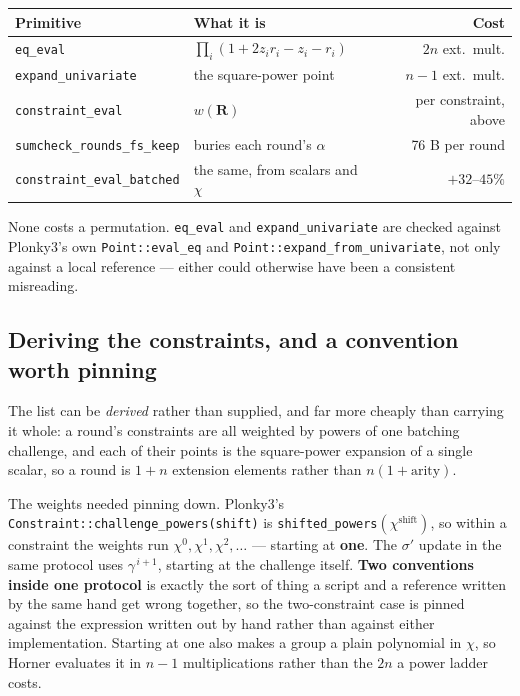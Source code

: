 \documentclass[11pt,a4paper]{article}
\begin{document}
\begin{center}\small
\begin{tabular}{@{}llr@{}}
\toprule
\textbf{Primitive} & \textbf{What it is} & \textbf{Cost}\\
\midrule
\texttt{eq\_eval} & $\prod_i (1+2z_ir_i-z_i-r_i)$ & $2n$ ext.\ mult.\\
\texttt{expand\_univariate} & the square-power point & $n-1$ ext.\ mult.\\
\texttt{constraint\_eval} & $w(\boldsymbol R)$ & per constraint, above\\
\texttt{sumcheck\_rounds\_fs\_keep} & buries each round's $\alpha$ & 76 B per round\\
\texttt{constraint\_eval\_batched} & the same, from scalars and $\chi$ & $+32$--$45\%$\\
\bottomrule
\end{tabular}
\end{center}
\begin{center}\footnotesize\color{muted}
None costs a permutation. \texttt{eq\_eval} and \texttt{expand\_univariate} are checked against
Plonky3's own \texttt{Point::eval\_eq} and \texttt{Point::expand\_from\_univariate}, not only against
a local reference --- either could otherwise have been a consistent misreading.
\end{center}

\subsection*{Deriving the constraints, and a convention worth pinning}

The list can be \emph{derived} rather than supplied, and far more cheaply than carrying it whole: a
round's constraints are all weighted by powers of one batching challenge, and each of their points is
the square-power expansion of a single scalar, so a round is $1+n$ extension elements rather than
$n(1+\text{arity})$.

The weights needed pinning down. Plonky3's \texttt{Constraint::challenge\_powers(shift)} is
\texttt{shifted\_powers}$(\chi^{\text{shift}})$, so within a constraint the weights run
$\chi^{0},\chi^{1},\chi^{2},\dots$ --- starting at \textbf{one}. The $\sigma'$ update in the same
protocol uses $\gamma^{\,i+1}$, starting at the challenge itself. \textbf{Two conventions inside one
protocol} is exactly the sort of thing a script and a reference written by the same hand get wrong
together, so the two-constraint case is pinned against the expression written out by hand rather than
against either implementation. Starting at one also makes a group a plain polynomial in $\chi$, so
Horner evaluates it in $n-1$ multiplications rather than the $2n$ a power ladder costs.
\end{document}
